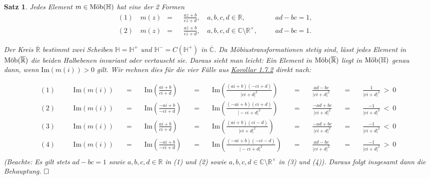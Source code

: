 \documentclass[11pt]{book}
\numberwithin{dummy}{section}
\newtheorem{theorem}{Satz}[section]
\theoremstyle{nonumberbreak}
\newenvironment{pr}[1][]{\ifthenelse{\equal{#1}{}}{\proof}{\proof[#1]}\rm}{\endproof}
\newcommand{\C}{\mathbb{C}}
\newcommand{\R}{\mathbb{R}}
\newcommand{\He}{\mathbb{H}}
\newcommand{\RR}{\overline{\mathbb{R}}}
\newcommand{\CC}{\overline{\mathbb{C}}}
\newcommand{\amobh}{\textup{Möb}(\mathbb{H})}
\newcommand{\amobr}{\textup{Möb}(\overline{\mathbb{R}})}
\begin{document}
\begin{spacing}{1.4}
\hypertarget{satzeinssiebendrei}{}
\begin{theorem} %
Jedes Element $m \in \amobh$ hat eine der 2 Formen
\setlength{\abovedisplayskip}{5.5pt}
\setlength{\belowdisplayskip}{5.5pt}
\begin{alignat*}{5}
(1) \quad m(z) &=&& \frac{az+b}{cz+d}, \quad a,b,c,d \in \R, \quad &&ad-bc = 1,\\
(2) \quad m(z) &=&& \frac{a \overline{z} +b}{c \overline{z} +d}, \quad a,b,c,d \in \C \setminus \R^{\times}, \quad &&ad-bc = 1.
\end{alignat*}

\begin{pr}
Der Kreis $\RR$ bestimmt zwei Scheiben $\He = \He^{+}$ und $\He^- = C(\He^+)$ in $\CC$. Da Möbiustransformationen stetig sind, lässt jedes Element in $\amobr$ die beiden Halbebenen invariant oder vertauscht sie. Daraus sieht man leicht: Ein Element in $\amobr$ liegt in $\amobh$ genau dann, wenn $\mathrm{Im}(m(i)) >0$ gilt. Wir rechnen dies für die vier Fälle aus \hyperlink{coreinssiebenzwei}{Korollar 1.7.2} direkt nach:

\setlength{\abovedisplayskip}{5.5pt}
\setlength{\belowdisplayskip}{5.5pt}
\begin{alignat*}{15}
&(1)&& \quad \mathrm{Im}(m(i))\  &&=&&\ \mathrm{Im} \left( \frac{ai+b}{ci+d}\right) \  &&=&& \ \mathrm{Im} \left( \frac{(ai+b)(-ci+d)}{\vert ci+d\vert^2} \right) \ &&=&& \ \frac{ad-bc}{\vert ci +d \vert^2} \ &&=&&\  \frac{1}{\vert ci+d\vert^2} \ >\ 0 \\
&(2)&& \quad \mathrm{Im}(m(i))\  &&=&& \ \mathrm{Im}\left( \frac{-ai+b}{-ci+d} \right) \  &&=&& \  \mathrm{Im}\left( \frac{(-ai+b)(ci+d)}{\vert -ci+d\vert^2} \right) \  &&=&& \ \frac{-ad+bc}{\vert ci +d \vert^2} \  &&=&& \  \frac{-1}{\vert ci+d\vert^2} \  <\  0 \\
&(3)&& \quad \mathrm{Im}(m(i))\  &&=&& \ \mathrm{Im}\left( \frac{ai+b}{ci+d} \right) \  &&=&& \  \mathrm{Im}\left( \frac{(ai+b)(ci-d)}{\vert ci+d\vert^2} \right) \  &&=&& \ \frac{-ad+bc}{\vert ci +d \vert^2} \  &&=&& \  \frac{-1}{\vert ci+d\vert^2} \  <\  0 \\
&(4)&& \quad \mathrm{Im}(m(i))\  &&=&& \ \mathrm{Im}\left( \frac{-ai+b}{-ci+d} \right) \  &&=&& \  \mathrm{Im}\left( \frac{(-ai+b)(-ci-d)}{\vert -ci+d\vert^2} \right) \  &&=&& \ \frac{ad-bc}{\vert ci +d \vert^2} \  &&=&& \  \frac{-1}{\vert ci+d\vert^2} \  >\  0 \\
\end{alignat*}
(Beachte: Es gilt stets $ad-bc =1$ sowie $a,b,c,d \in \R$ in (1) und (2) sowie $a,b,c,d \in \C \setminus \R^{\times}$ in (3) und (4)). Daraus folgt insgesamt dann die Behauptung. $\hfill \Box$


\end{pr}
\end{theorem}
\end{spacing}
\end{document}
